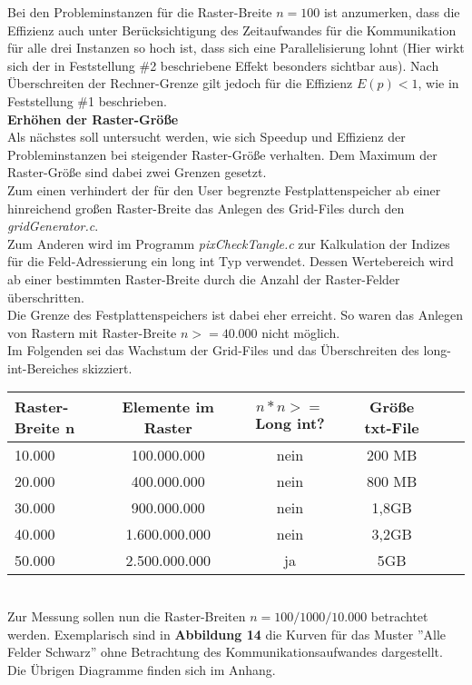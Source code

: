 \documentclass[
10pt, %
a4paper, %
oneside, %
headinclude,footinclude, %
BCOR5mm, %
]{scrartcl}
\begin{document}
Bei den Probleminstanzen für die Raster-Breite \(n=100\) ist anzumerken, dass die Effizienz auch unter Berücksichtigung des Zeitaufwandes für die Kommunikation für alle drei Instanzen so hoch ist, dass sich eine Parallelisierung lohnt (Hier wirkt sich der in Feststellung \#2 beschriebene Effekt besonders sichtbar aus). Nach Überschreiten der Rechner-Grenze gilt jedoch für die Effizienz \(E(p)<1\), wie in Feststellung \#1 beschrieben.\\

\textbf{Erhöhen der Raster-Größe}\\
Als nächstes soll untersucht werden, wie sich Speedup und Effizienz der Probleminstanzen bei steigender Raster-Größe verhalten. 
Dem Maximum der Raster-Größe sind dabei zwei Grenzen gesetzt.\\
Zum einen verhindert der für den User begrenzte Festplattenspeicher ab einer hinreichend großen Raster-Breite das Anlegen des Grid-Files durch den \textit{gridGenerator.c}.\\
Zum Anderen wird im Programm \textit{pixCheckTangle.c} zur Kalkulation der Indizes für die Feld-Adressierung ein long int Typ verwendet. Dessen Wertebereich wird ab einer bestimmten Raster-Breite durch die Anzahl der Raster-Felder überschritten.\\
Die Grenze des Festplattenspeichers ist dabei eher erreicht. So waren das Anlegen von Rastern mit Raster-Breite \(n>=40.000\) nicht möglich.\\

Im Folgenden sei das Wachstum der Grid-Files und das Überschreiten des long-int-Bereiches skizziert.\\


\begin{tabular}{l|c|c|c|c|c|}
	\hline 
	Raster-Breite n& Elemente im Raster & \(n*n>=\)Long int? & Größe txt-File \\ 
	\hline 
	10.000 & 100.000.000 & nein & 200 MB\\
	\hline 
	20.000 & 400.000.000 & nein & 800 MB \\
	\hline
	30.000 & 900.000.000 & nein &  1,8GB \\
	\hline  
	40.000 & 1.600.000.000 & nein & 3,2GB \\
	\hline
	50.000 & 2.500.000.000 & ja & 5GB \\
	\hline  
\end{tabular}\\

Zur Messung sollen nun die Raster-Breiten \(n=100/1000/10.000\) betrachtet werden. Exemplarisch sind in \textbf{Abbildung 14 } die Kurven für das Muster ''Alle Felder Schwarz'' ohne Betrachtung des Kommunikationsaufwandes dargestellt. Die Übrigen Diagramme finden sich im Anhang.\\
 
\end{document}
